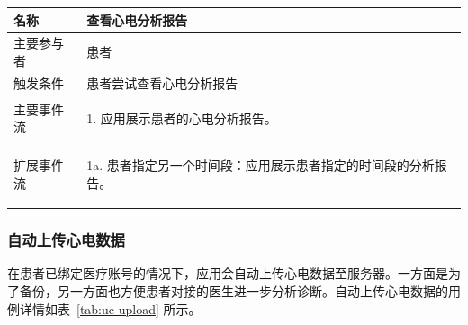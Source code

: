 \begin{table}[!ht]
    \label{tab:uc-report}
    \begin{tabularx}{\textwidth}{|l|X|}
        \hline
        名称    & 查看心电分析报告     \\
        \hline
        主要参与者 & 患者           \\
        \hline
        触发条件  & 患者尝试查看心电分析报告 \\
        \hline
        主要事件流 &
        \begin{itemizec}
            \item[1.] 应用展示患者的心电分析报告。
        \end{itemizec} \\
        \hline
        扩展事件流 &
        \begin{itemizec}
            \item[1a.] 患者指定另一个时间段：应用展示患者指定的时间段的分析报告。
        \end{itemizec} \\
        \hline
    \end{tabularx}
\end{table}

\subsubsection{自动上传心电数据}

在患者已绑定医疗账号的情况下，应用会自动上传心电数据至服务器。一方面是为了备份，另一方面也方便患者对接的医生进一步分析诊断。自动上传心电数据的用例详情如表~\ref{tab:uc-upload} 所示。

